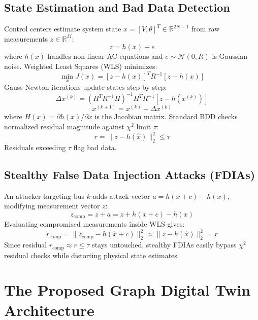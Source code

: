 \documentclass[conference]{IEEEtran}
\begin{document}
\subsection{State Estimation and Bad Data Detection}
Control centers estimate system state $x = [V, \theta]^T \in \mathbb{R}^{2N-1}$ from raw measurements $z \in \mathbb{R}^M$:
\begin{equation}
z = h(x) + e
\end{equation}
where $h(x)$ handles non-linear AC equations and $e \sim \mathcal{N}(0, R)$ is Gaussian noise. Weighted Least Squares (WLS) minimizes:
\begin{equation}
\min_x J(x) = [z - h(x)]^T R^{-1} [z - h(x)]
\end{equation}
Gauss-Newton iterations update states step-by-step:
\begin{equation}
\Delta x^{(k)} = \left( H^T R^{-1} H \right)^{-1} H^T R^{-1} [z - h(x^{(k)})]
\end{equation}
\begin{equation}
x^{(k+1)} = x^{(k)} + \Delta x^{(k)}
\end{equation}
where $H(x) = \partial h(x) / \partial x$ is the Jacobian matrix. Standard BDD checks normalized residual magnitude against $\chi^2$ limit $\tau$:
\begin{equation}
r = \|z - h(\hat{x})\|_2^2 \le \tau
\end{equation}
Residuals exceeding $\tau$ flag bad data.

\subsection{Stealthy False Data Injection Attacks (FDIAs)}
An attacker targeting bus $k$ adds attack vector $a = h(x+c) - h(x)$, modifying measurement vector $z$:
\begin{equation}
z_{\text{comp}} = z + a = z + h(x + c) - h(x)
\end{equation}
Evaluating compromised measurements inside WLS gives:
\begin{equation}
r_{\text{comp}} = \|z_{\text{comp}} - h(\hat{x} + c)\|_2^2 \approx \|z - h(\hat{x})\|_2^2 = r
\end{equation}
Since residual $r_{\text{comp}} \approx r \le \tau$ stays untouched, stealthy FDIAs easily bypass $\chi^2$ residual checks while distorting physical state estimates.

\section{The Proposed Graph Digital Twin Architecture}
\end{document}
